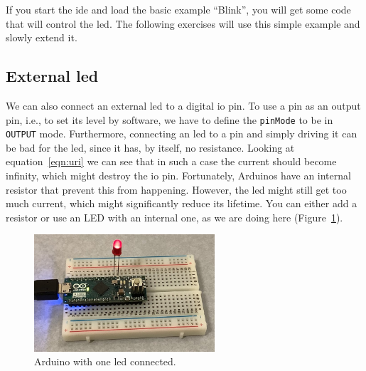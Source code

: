 If you start the \ac{ide} and load the basic example ``Blink'', you will get some code that will control the \ac{led}. The following exercises will use this simple example and slowly extend it.


\subsection{External \acs{led}}

We can also connect an external \ac{led} to a digital \ac{io} pin. To use a pin as an output pin, i.e., to set its level by software, we have to define the \lstinline{pinMode} to be in \lstinline{OUTPUT} mode. Furthermore, connecting an \ac{led} to a pin and simply driving it can be bad for the \ac{led}, since it has, by itself, no resistance. Looking at equation~\eqref{eqn:uri} we can see that in such a case the current should become infinity, which might destroy the \ac{io} pin. Fortunately, Arduinos have an internal resistor that prevent this from happening. However, the \ac{led} might still get too much current, which might significantly reduce its lifetime. You can either add a resistor or use an LED with an internal one, as we are doing here (Figure~\ref{fig:blink:arduino_led}).

\begin{figure}[htb]
    \centering
    \includegraphics[width=0.6\textwidth]{graphics/01_blink/arduino_led.jpg}
    \caption{Arduino with one \ac{led} connected.}
    \label{fig:blink:arduino_led}
\end{figure}

